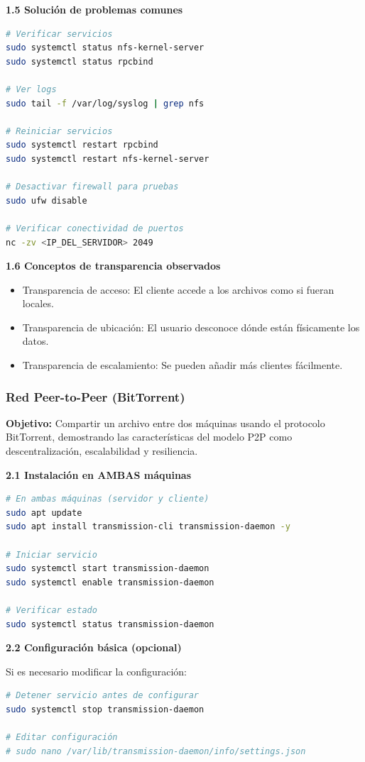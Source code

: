 \documentclass[stu, 12pt, letterpaper, donotrepeattitle, floatsintext, noapacite]{apa7}
\begin{document}
\textbf{1.5 Solución de problemas comunes}
\begin{lstlisting}[language=bash]
# Verificar servicios
sudo systemctl status nfs-kernel-server
sudo systemctl status rpcbind

# Ver logs
sudo tail -f /var/log/syslog | grep nfs

# Reiniciar servicios
sudo systemctl restart rpcbind
sudo systemctl restart nfs-kernel-server

# Desactivar firewall para pruebas
sudo ufw disable

# Verificar conectividad de puertos
nc -zv <IP_DEL_SERVIDOR> 2049
\end{lstlisting}

\textbf{1.6 Conceptos de transparencia observados}
\begin{itemize}
    \item Transparencia de acceso: El cliente accede a los archivos como si fueran locales.
    \item Transparencia de ubicación: El usuario desconoce dónde están físicamente los datos.
    \item Transparencia de escalamiento: Se pueden añadir más clientes fácilmente.
\end{itemize}

\subsubsection{Red Peer-to-Peer (BitTorrent)}
\textbf{Objetivo:} Compartir un archivo entre dos máquinas usando el protocolo BitTorrent, demostrando las características del modelo P2P como descentralización, escalabilidad y resiliencia.

\textbf{2.1 Instalación en AMBAS máquinas}
\begin{lstlisting}[language=bash]
# En ambas máquinas (servidor y cliente)
sudo apt update
sudo apt install transmission-cli transmission-daemon -y

# Iniciar servicio
sudo systemctl start transmission-daemon
sudo systemctl enable transmission-daemon

# Verificar estado
sudo systemctl status transmission-daemon
\end{lstlisting}

\textbf{2.2 Configuración básica (opcional)}

Si es necesario modificar la configuración:
\begin{lstlisting}[language=bash]
# Detener servicio antes de configurar
sudo systemctl stop transmission-daemon

# Editar configuración
# sudo nano /var/lib/transmission-daemon/info/settings.json
\end{lstlisting}
\end{document}
